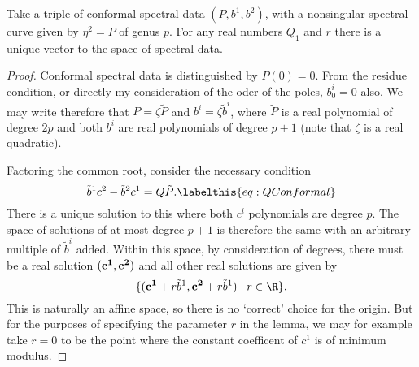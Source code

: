 
















\begin{lem}
Take a triple of conformal spectral data $(P,b^1,b^2)$, with a nonsingular spectral curve given by $η^2 = P$ of genus $p$. For any real numbers $Q_1$ and $r$ there is a unique vector to the space of spectral data.

\begin{proof}
Conformal spectral data is distinguished by $P(0)=0$. From the residue condition, or directly my consideration of the oder of the poles, $b^i_0 = 0$ also. We may write therefore that $P= ζ\tilde{P}$ and $b^i = ζ \tilde{b}^i$, where $\tilde{P}$ is a real polynomial of degree $2p$ and both $b^i$ are real polynomials of degree $p+1$ (note that $ζ$ is a real quadratic).

Factoring the common root, consider the necessary condition
\[
\tilde{b}^1 c^2 - \tilde{b}^2 c^1 = Q\tilde{P}.\labelthis{eq:QConformal}
\]
There is a unique solution to this where both $c^i$ polynomials are degree $p$. The space of solutions of at most degree $p+1$ is therefore the same with an arbitrary multiple of $\tilde{b}^i$ added. Within this space, by consideration of degrees, there must be a real solution $(\bf c^1, \bf c^2)$ and all other real solutions are given by
\[
\{ ({\bf c^1} + r \tilde{b}^1, {\bf c^2} + r \tilde{b}^1) \mid r\in \R\}.
\]
This is naturally an affine space, so there is no `correct' choice for the origin. But for the purposes of specifying the parameter $r$ in the lemma, we may for example take $r=0$ to be the point where the constant coefficent of $c^1$ is of minimum modulus.


\end{proof}
\end{lem}
